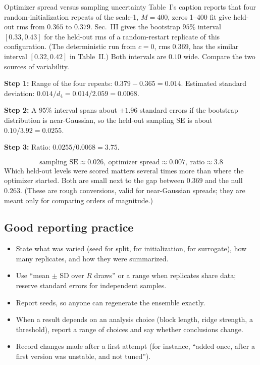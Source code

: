 \begin{sample}{Optimizer spread versus sampling uncertainty}
Table~I's caption reports that four random-initialization repeats of the scale-1, $M=400$, zeros 1--400 fit give held-out rms from $0.365$ to $0.379$. Sec.~III gives the bootstrap $95\%$ interval $[0.33,0.43]$ for the held-out rms of a random-restart replicate of this configuration. (The deterministic run from $c=0$, rms $0.369$, has the similar interval $[0.32,0.42]$ in Table~II.) Both intervals are $0.10$ wide. Compare the two sources of variability.

\textbf{Step 1:} Range of the four repeats: $0.379-0.365=0.014$. Estimated standard deviation: $0.014/d_4=0.014/2.059=0.0068$.

\textbf{Step 2:} A $95\%$ interval spans about $\pm1.96$ standard errors if the bootstrap distribution is near-Gaussian, so the held-out sampling SE is about $0.10/3.92=0.0255$.

\textbf{Step 3:} Ratio: $0.0255/0.0068=3.75$.

\[
\boxed{\text{sampling SE}\approx0.026,\ \text{optimizer spread}\approx0.007,\ \text{ratio}\approx3.8}
\]
Which held-out levels were scored matters several times more than where the optimizer started. Both are small next to the gap between $0.369$ and the null $0.263$. (These are rough conversions, valid for near-Gaussian spreads; they are meant only for comparing orders of magnitude.)
\end{sample}

\subsection{Good reporting practice}

\begin{itemize}
\item State what was varied (seed for split, for initialization, for surrogate), how many replicates, and how they were summarized.
\item Use ``mean $\pm$ SD over $R$ draws'' or a range when replicates share data; reserve standard errors for independent samples.
\item Report seeds, so anyone can regenerate the ensemble exactly.
\item When a result depends on an analysis choice (block length, ridge strength, a threshold), report a range of choices and say whether conclusions change.
\item Record changes made after a first attempt (for instance, ``added once, after a first version was unstable, and not tuned'').
\end{itemize}

